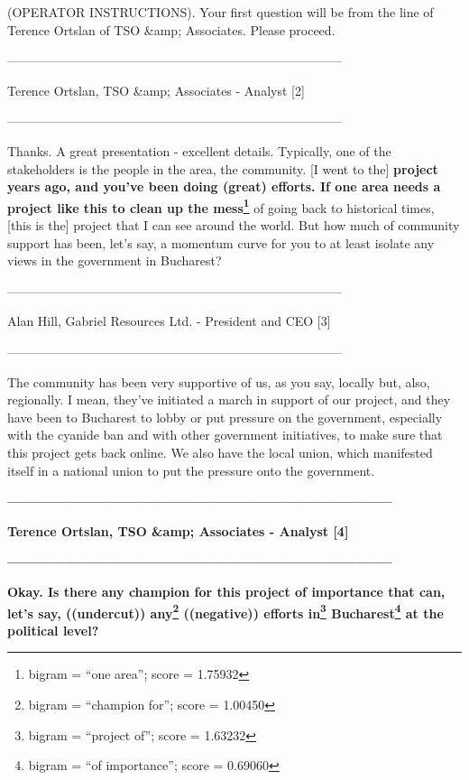 \documentclass{article}
\begin{document}
 (OPERATOR INSTRUCTIONS). Your first question will be from the line of Terence Ortslan of TSO \&amp; Associates. Please proceed. 

 -------------------------------------------------------------------------------- 

 Terence Ortslan, TSO \&amp; Associates - Analyst [2] 

 -------------------------------------------------------------------------------- 

 Thanks. A great presentation - excellent details. Typically, one of the stakeholders is the people in the area, the community. [I went to the] \textbf{project years ago, and you've been doing (great) efforts. If one area needs a project like this to clean up the mess\footnote{bigram = ``one area''; score = 1.75932}} of going back to historical times, [this is the] project that I can see around the world. But how much of community support has been, let's say, a momentum curve for you to at least isolate any views in the government in Bucharest? 

 -------------------------------------------------------------------------------- 

 Alan Hill, Gabriel Resources Ltd. - President and CEO [3] 

 -------------------------------------------------------------------------------- 

 The community has been very supportive of us, as you say, locally but, also, regionally. I mean, they've initiated a march in support of our project, and they have been to Bucharest to lobby or put pressure on the government, especially with the cyanide ban and with other government initiatives, to make sure that this project gets back online. We also have the local union, which manifested itself in a national union to put the pressure onto the government. 

 \textbf{--------------------------------------------------------------------------------} 

 \textbf{Terence Ortslan, TSO \&amp; Associates - Analyst [4]} 

 \textbf{--------------------------------------------------------------------------------} 

 \textbf{Okay. Is there any champion for this project of importance that can, let's say, ((undercut)) any\footnote{bigram = ``champion for''; score = 1.00450} ((negative)) efforts in\footnote{bigram = ``project of''; score = 1.63232} Bucharest\footnote{bigram = ``of importance''; score = 0.69060} at the political level?} 
\end{document}
